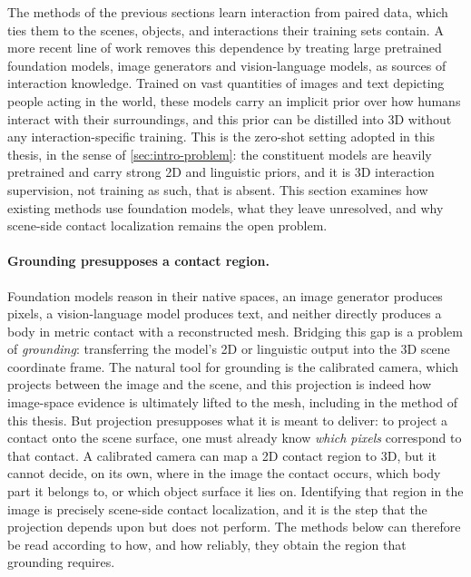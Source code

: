 The methods of the previous sections learn interaction from paired data, which ties them to the scenes, objects, and interactions their training sets contain. A more recent line of work removes this dependence by treating large pretrained foundation models, image generators and vision-language models, as sources of interaction knowledge. Trained on vast quantities of images and text depicting people acting in the world, these models carry an implicit prior over how humans interact with their surroundings, and this prior can be distilled into 3D without any interaction-specific training. This is the zero-shot setting adopted in this thesis, in the sense of \cref{sec:intro-problem}: the constituent models are heavily pretrained and carry strong 2D and linguistic priors, and it is 3D interaction supervision, not training as such, that is absent. This section examines how existing methods use foundation models, what they leave unresolved, and why scene-side contact localization remains the open problem.

\paragraph{Grounding presupposes a contact region.} Foundation models reason in their native spaces, an image generator produces pixels, a vision-language model produces text, and neither directly produces a body in metric contact with a reconstructed mesh. Bridging this gap is a problem of \emph{grounding}: transferring the model's 2D or linguistic output into the 3D scene coordinate frame. The natural tool for grounding is the calibrated camera, which projects between the image and the scene, and this projection is indeed how image-space evidence is ultimately lifted to the mesh, including in the method of this thesis. But projection presupposes what it is meant to deliver: to project a contact onto the scene surface, one must already know \emph{which pixels} correspond to that contact. A calibrated camera can map a 2D contact region to 3D, but it cannot decide, on its own, where in the image the contact occurs, which body part it belongs to, or which object surface it lies on. Identifying that region in the image is precisely scene-side contact localization, and it is the step that the projection depends upon but does not perform. The methods below can therefore be read according to how, and how reliably, they obtain the region that grounding requires.

